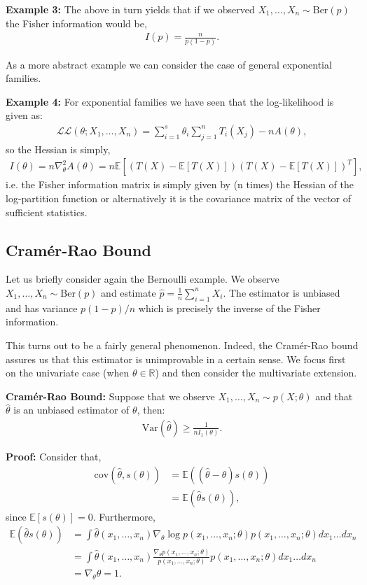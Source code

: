 \documentclass[twoside,12pt]{article}
\begin{document}
{\bf Example 3: } The above in turn yields that if we observed $X_1,\ldots,X_n \sim \text{Ber}(p)$ the Fisher information would be,
\begin{align*}
I(p) = \frac{n}{p(1-p)}.
\end{align*}

As a more abstract example we can consider the case of general exponential families. 

{\bf Example 4: } For exponential families we have seen that the log-likelihood is given as:
\begin{align*}
\mathcal{LL}(\theta; X_1,\ldots,X_n) = \sum_{i=1}^s \theta_i \sum_{j=1}^n T_i(X_j) - nA(\theta),
\end{align*}
so the Hessian is simply, 
\begin{align*}
I(\theta) = n \nabla_{\theta}^2 A(\theta) = n \mathbb{E}[(T(X) - \mathbb{E}[T(X)])(T(X) - \mathbb{E}[T(X)])^T],
\end{align*}
i.e. the Fisher information matrix is simply given by (n times) the Hessian of the log-partition function or alternatively it is the covariance matrix of the vector of sufficient statistics. 

\subsection{Cram\'{e}r-Rao Bound}
Let us briefly consider again the Bernoulli example. We observe $X_1,\ldots,X_n \sim \text{Ber}(p)$ and estimate $\widehat{p} = \frac{1}{n} \sum_{i=1}^n X_i$. The estimator is unbiased and has variance $p(1-p)/n$ which is precisely the inverse of the Fisher information.

This turns out to be a fairly general phenomenon. Indeed, the Cram\'{e}r-Rao bound assures us that this estimator is unimprovable in a certain sense. We focus first on the univariate case (when $\theta \in \mathbb{R}$) and then consider the multivariate extension. 

{\bf Cram\'{e}r-Rao Bound: } Suppose that we observe $X_1,\ldots,X_n \sim p(X;\theta)$ and that $\widehat{\theta}$ is an unbiased estimator of $\theta$, then:
\begin{align*}
\text{Var}(\widehat{\theta}) \geq \frac{1}{n I_1(\theta)}.
\end{align*}

{\bf Proof: } Consider that,
\begin{align*}
\text{cov}(\widehat{\theta}, s(\theta)) &= \mathbb{E}((\widehat{\theta} - \theta)s(\theta)) \\
&= \mathbb{E} (\widehat{\theta} s(\theta)),
\end{align*}
since $\mathbb{E}[s(\theta)] = 0$. Furthermore,
\begin{align*}
\mathbb{E} (\widehat{\theta} s(\theta)) &= \int \widehat{\theta}(x_1,\ldots,x_n) \nabla_{\theta} \log p(x_1,\ldots,x_n; \theta) p(x_1,\ldots,x_n;\theta) dx_1 \ldots dx_n \\
&=  \int \widehat{\theta}(x_1,\ldots,x_n)  \frac{\nabla_{\theta} p(x_1,\ldots,x_n;\theta)}{ p(x_1,\ldots,x_n; \theta) }p(x_1,\ldots,x_n;\theta) dx_1 \ldots dx_n \\
&= \nabla_{\theta} \theta = 1.
\end{align*}
\end{document}

